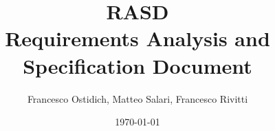 
\title{\Huge RASD \\[4mm] \Large Requirements Analysis and Specification Document \\[4mm]}
\author{Francesco Ostidich, Matteo Salari, Francesco Rivitti}
\date{\today}
\maketitle
\vspace{12mm}
\tableofcontents
\newpage

